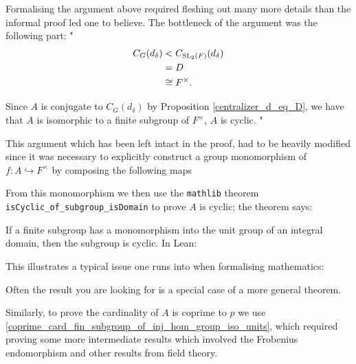 \begin{remark}
Formalising the argument above required fleshing out many more details than the informal proof led one to
believe. The bottleneck of the argument was the following part:
"
\begin{align*}  C_G(d_\delta) &<  C_{\operatorname{SL}_2(F)}(d_\delta) 
  \\ &= D  
  \\ &\cong F^\times.  
  \end{align*}

Since $A$ is conjugate to $C_G(d_\delta)$ by Proposition \ref{centralizer_d_eq_D}, 
we have that $A$ is isomorphic to a finite subgroup of $F^\times$, $A$ is cyclic.
"

This argument which has been left intact in the proof, had to be heavily modified since it was necessary to explicitly 
construct a group monomorphism of $f : A \hookrightarrow F^\times$
by composing the following maps

\begin{center}
\end{center}

From this monomorphism we then use the \texttt{mathlib} theorem \texttt{isCyclic\_of\_subgroup\_isDomain} to prove $A$ is cyclic; the theorem says: 

If a finite subgroup has a monomorphism into the unit group of an integral domain, then the subgroup is cyclic. In Lean:



This illustrates a typical issue one runs into when formalising mathematics:

Often the result you are looking for is a special case of a more general theorem.

Similarly, to prove the cardinality of $A$ is coprime to $p$ we use \ref{coprime_card_fin_subgroup_of_inj_hom_group_iso_units}, which required
proving some more intermediate results which involved the Frobenius endomorphism and other results from field theory.
\end{remark}


